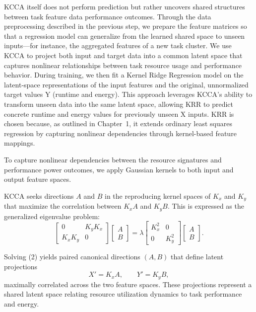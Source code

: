 KCCA itself does not perform prediction but rather uncovers shared structures between task feature data performance outcomes. Through the data preprocessing described in the previous step, we prepare the feature matrices so that a regression model can generalize from the learned shared space to unseen inputs—for instance, the aggregated features of a new task cluster. We use KCCA to project both input and target data into a common latent space that captures nonlinear relationships between task resource usage and performance behavior. During training, we then fit a Kernel Ridge Regression model on the latent-space representations of the input features and the original, unnormalized target values Y (runtime and energy). This approach leverages KCCA's ability to transform unseen data into the same latent space, allowing KRR to predict concrete runtime and energy values for previously unseen X inputs. KRR is chosen because, as outlined in Chapter~1, it extends ordinary least squares regression by capturing nonlinear dependencies through kernel-based feature mappings.

To capture nonlinear dependencies between the resource signatures
and performance power outcomes, we apply Gaussian kernels to both
input and output feature spaces.

KCCA seeks directions \(A\) and \(B\) in the
reproducing kernel spaces of \(K_x\) and \(K_y\)
that maximize the correlation between
\( K_x A \) and \( K_y B \).
This is expressed as the generalized eigenvalue problem:
\[
    \begin{bmatrix}
        0       & K_y K_x \\
        K_x K_y & 0
    \end{bmatrix}
    \begin{bmatrix}
        A \\ B
    \end{bmatrix}
    =
    \lambda
    \begin{bmatrix}
        K_x^2 & 0     \\
        0     & K_y^2
    \end{bmatrix}
    \begin{bmatrix}
        A \\ B
    \end{bmatrix}.
    \tag{2}
\]

Solving (2) yields paired canonical directions
\( (A, B) \) that define latent projections
\[
    X' = K_x A, \qquad Y' = K_y B,
\]
maximally correlated across the two feature spaces.
These projections represent a shared latent space
relating resource utilization dynamics to task performance and energy.

